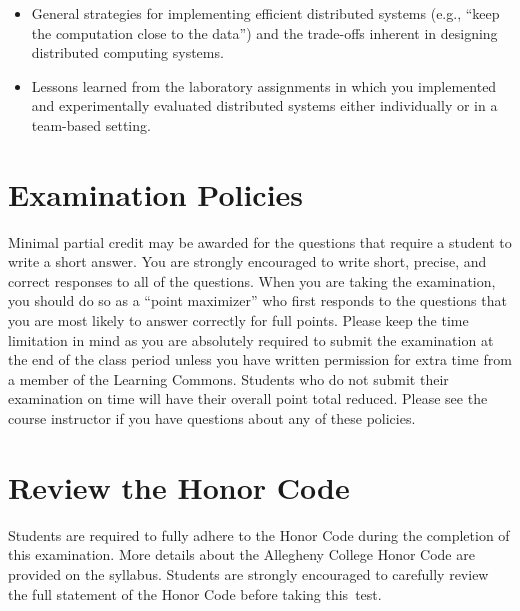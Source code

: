 \begin{itemize}[leftmargin=0.25in]
\begin{itemize}[leftmargin=0in]
      \item General strategies for implementing efficient distributed systems (e.g., ``keep the computation close to the
        data'') and the trade-offs inherent in designing distributed computing systems.

      \item Lessons learned from the laboratory assignments in which you implemented and experimentally evaluated
        distributed systems either individually or in a team-based setting.


    \end{itemize}

\end{itemize}

\vspace*{-.05in}
\section*{Examination Policies}

\vspace*{-.05in}
\noindent Minimal partial credit may be awarded for the questions that require a student to write a short answer. You
are strongly encouraged to write short, precise, and correct responses to all of the questions. When you are taking the
examination, you should do so as a ``point maximizer'' who first responds to the questions that you are most likely to
answer correctly for full points. Please keep the time limitation in mind as you are absolutely required to submit the
examination at the end of the class period unless you have written permission for extra time from a member of the
Learning Commons. Students who do not submit their examination on time will have their overall point total reduced.
Please see the course instructor if you have questions about any of these policies.

\vspace*{-.2in}
\section*{Review the Honor Code}
\vspace*{-.1in}

\noindent Students are required to fully adhere to the Honor Code during the completion of this examination. More
details about the Allegheny College Honor Code are provided on the syllabus. Students are strongly encouraged to
carefully review the full statement of the Honor Code before taking \mbox{this test}.

